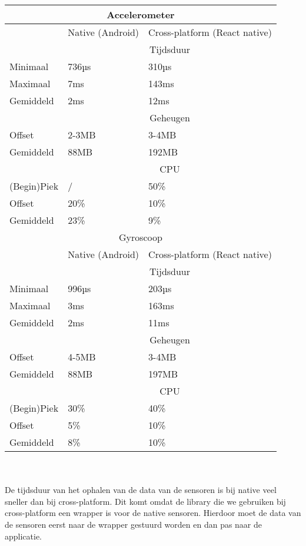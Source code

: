 \begin{tabular}{ |p{3cm}||p{5cm}|p{5cm}| }
    \hline
    \multicolumn{3}{|c|}{Accelerometer} \\ 
    \hline
     & Native (Android) & Cross-platform (React native) \\
    \hline
     & \multicolumn{2}{|c|}{Tijdsduur} \\
    \hline
    Minimaal & 736µs & 310µs \\
    Maximaal & 7ms & 143ms \\
    Gemiddeld & 2ms & 12ms \\
    \hline
     & \multicolumn{2}{|c|}{Geheugen} \\ 
    \hline
    Offset & 2-3MB & 3-4MB \\
    Gemiddeld & 88MB & 192MB \\
    \hline
     & \multicolumn{2}{|c|}{CPU} \\
    \hline
    (Begin)Piek & / & 50\% \\
    Offset & 20\% & 10\% \\
    Gemiddeld & 23\% & 9\% \\
    \hline
    \multicolumn{3}{|c|}{Gyroscoop} \\ 
    \hline
     & Native (Android) & Cross-platform (React native) \\
    \hline
     & \multicolumn{2}{|c|}{Tijdsduur} \\
    \hline
    Minimaal & 996µs & 203µs \\
    Maximaal & 3ms & 163ms \\
    Gemiddeld & 2ms & 11ms \\
    \hline
     & \multicolumn{2}{|c|}{Geheugen} \\ 
    \hline
    Offset & 4-5MB & 3-4MB \\
    Gemiddeld & 88MB & 197MB \\
    \hline
     & \multicolumn{2}{|c|}{CPU} \\
    \hline
    (Begin)Piek & 30\% & 40\% \\
    Offset & 5\% & 10\% \\
    Gemiddeld & 8\% & 10\% \\
    \hline
\end{tabular}
\\\\
De tijdsduur van het ophalen van de data van de sensoren is bij native veel sneller dan bij cross-platform.
Dit komt omdat de library die we gebruiken bij cross-platform een wrapper is voor de native sensoren.
Hierdoor moet de data van de sensoren eerst naar de wrapper gestuurd worden en dan pas naar de applicatie.
